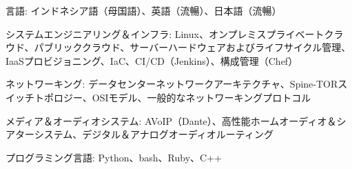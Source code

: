 

\begin{cvparagraph}

\begin{cvbullets}
    \item 言語: インドネシア語（母国語）、英語（流暢）、日本語（流暢）
    \item システムエンジニアリング＆インフラ: Linux、オンプレミスプライベートクラウド、パブリッククラウド、サーバーハードウェアおよびライフサイクル管理、IaaSプロビジョニング、IaC、CI/CD（Jenkins）、構成管理（Chef）
    \item ネットワーキング: データセンターネットワークアーキテクチャ、Spine-TORスイッチトポロジー、OSIモデル、一般的なネットワーキングプロトコル
    \item メディア＆オーディオシステム: AVoIP（Dante）、高性能ホームオーディオ＆シアターシステム、デジタル＆アナログオーディオルーティング
    \item プログラミング言語: Python、bash、Ruby、C++
\end{cvbullets}
\end{cvparagraph}
